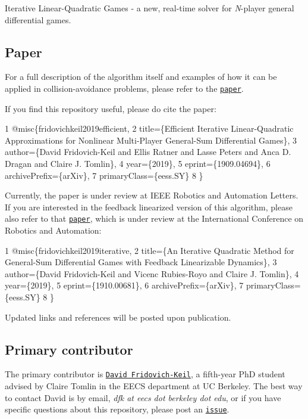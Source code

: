  

Iterative Linear-\/\+Quadratic Games -\/ a new, real-\/time solver for {\itshape N}-\/player general differential games.

\subsection*{Paper}

For a full description of the algorithm itself and examples of how it can be applied in collision-\/avoidance problems, please refer to the \href{https://arxiv.org/abs/1909.04694}{\tt paper}.

If you find this repository useful, please do cite the paper\+: 
\begin{DoxyCode}
1 @misc\{fridovichkeil2019efficient,
2     title=\{Efficient Iterative Linear-Quadratic Approximations for Nonlinear Multi-Player General-Sum
       Differential Games\},
3     author=\{David Fridovich-Keil and Ellis Ratner and Lasse Peters and Anca D. Dragan and Claire J.
       Tomlin\},
4     year=\{2019\},
5     eprint=\{1909.04694\},
6     archivePrefix=\{arXiv\},
7     primaryClass=\{eess.SY\}
8 \}
\end{DoxyCode}
 Currently, the paper is under review at I\+E\+EE Robotics and Automation Letters. If you are interested in the feedback linearized version of this algorithm, please also refer to that \href{https://arxiv.org/abs/1910.00681}{\tt paper}, which is under review at the International Conference on Robotics and Automation\+: 
\begin{DoxyCode}
1 @misc\{fridovichkeil2019iterative,
2     title=\{An Iterative Quadratic Method for General-Sum Differential Games with Feedback Linearizable
       Dynamics\},
3     author=\{David Fridovich-Keil and Vicenc Rubies-Royo and Claire J. Tomlin\},
4     year=\{2019\},
5     eprint=\{1910.00681\},
6     archivePrefix=\{arXiv\},
7     primaryClass=\{eess.SY\}
8 \}
\end{DoxyCode}
 Updated links and references will be posted upon publication.

\subsection*{Primary contributor}

The primary contributor is \href{https://people.eecs.berkeley.edu/~dfk/}{\tt David Fridovich-\/\+Keil}, a fifth-\/year PhD student advised by Claire Tomlin in the E\+E\+CS department at UC Berkeley. The best way to contact David is by email, {\itshape dfk at eecs dot berkeley dot edu}, or if you have specific questions about this repository, please post an \href{https://github.com/HJReachability/ilqgames/issues}{\tt issue}.

